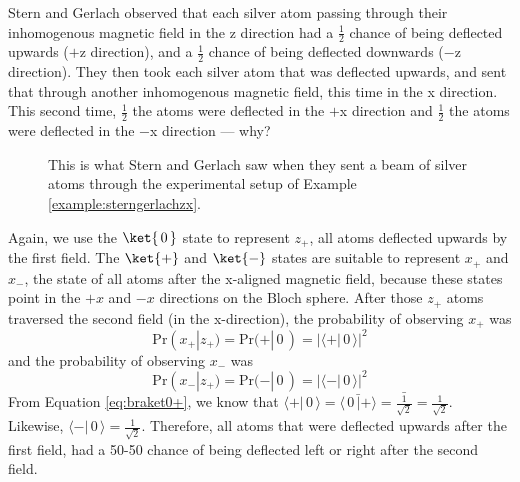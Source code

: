 \documentclass{article}
\theoremstyle{definition}
\newcommand*\conj[1]{\bar{#1}}
\newcommand{\abs}[1]{{\big\vert} #1 {\big\vert}}
\newcommand{\kz}[1]{\ket{\,#1\,}}
\newcommand{\kx}[1]{\ket{#1}}
\begin{document}
\begin{example} \label{example:sterngerlachzx}
	Stern and Gerlach observed that each silver atom passing through their inhomogenous magnetic field in the z direction had a $\frac{1}{2}$ chance of being deflected upwards ($+$z direction), and a $\frac{1}{2}$ chance of being deflected downwards ($-$z direction).  They then took each silver atom that was deflected upwards, and sent that through another inhomogenous magnetic field, this time in the x direction.  This second time, $\frac{1}{2}$ the atoms were deflected in the $+$x direction and $\frac{1}{2}$ the atoms were deflected in the $-$x direction --- why?
	
	\begin{figure}[H]
		\caption{This is what Stern and Gerlach saw when they sent a beam of silver atoms through the experimental setup of Example \ref{example:sterngerlachzx}.}
	\end{figure}

	\textnormal{Again, we use the $\kz0$ state to represent $z_+$, all atoms deflected upwards by the first field.  The $\kx+$ and $\kx-$ states are suitable to represent $x_+$ and $x_-$, the state of all atoms after the x-aligned magnetic field, because these states point in the $+x$ and $-x$ directions on the Bloch sphere.	After those $z_+$ atoms traversed the second field (in the x-direction), the probability of observing $x_+$ was
	\begin{equation}
		\text{Pr}(x_+|z_+) = \text{Pr}(+|\,0\,) = \abs{\langle+|\,0\,\rangle}^2
	\end{equation}
	and the probability of observing $x_-$ was
	\begin{equation}
		\text{Pr}(x_-|z_+) = \text{Pr}(-|\,0\,) = \abs{\langle-|\,0\,\rangle}^2
	\end{equation}
	From Equation \ref{eq:braket0+}, we know that $\langle+|\,0\,\rangle = \conj{\langle\,0\,|+\rangle} = \conj{\frac{1}{\sqrt{2}}} = \frac{1}{\sqrt{2}}$.  Likewise, $\langle-|\,0\,\rangle = \frac{1}{\sqrt{2}}$.  Therefore, all atoms that were deflected upwards after the first field, had a 50-50 chance of being deflected left or right after the second field.}
\end{example}
\end{document}
